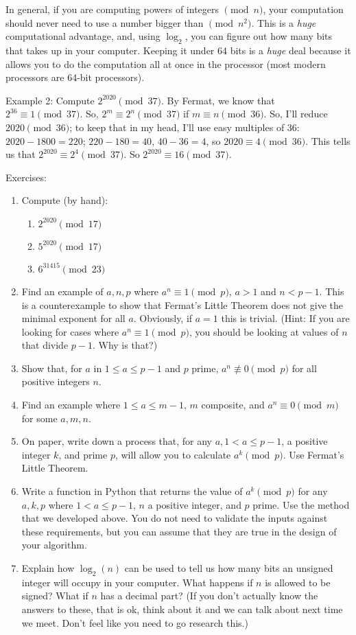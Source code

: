 \documentclass[12pt]{article}
\begin{document}
In general, if you are computing powers of integers $\pmod{n}$, your computation should never need to use a number bigger than $\pmod{n^2}$.  This is a \emph{huge} computational advantage, and, using $\log_2$, you can figure out how many bits that takes up in your computer.  Keeping it under 64 bits is a \emph{huge} deal because it allows you to do the computation all at once in the processor (most modern processors are 64-bit processors).

{\sc Example 2}: Compute $2^{2020} \pmod{37}$.  By Fermat, we know that $2^{36} \equiv 1 \pmod{37}$.  So, $2^m \equiv 2^n \pmod{37}$ if $m \equiv n \pmod{36}$.  So, I'll reduce $2020 \pmod {36}$; to keep that in my head, I'll use easy multiples of 36: $2020-1800 = 220$; $220-180=40$, $40-36=4$, so $2020 \equiv 4 \pmod{36}$.  This tells us that $2^{2020} \equiv 2^4 \pmod{37}$.  So $2^{2020} \equiv 16 \pmod{37}$.

{\sc Exercises}:
\begin{enumerate}
	\item
Compute (by hand):
	\begin{enumerate}
		\item $2^{2020} \pmod{17}$
		\item $5^{2020} \pmod{17}$
		\item $6^{31415} \pmod{23}$
	\end{enumerate}
	\item
Find an example of $a,n,p$ where $a^n \equiv 1 \pmod{p}$, $a > 1$ and $n < p-1$.  This is a counterexample to show that Fermat's Little Theorem does not give the minimal exponent for all $a$.  Obviously, if $a=1$ this is trivial. (Hint: If you are looking for cases where $a^n \equiv 1 \pmod{p}$, you should be looking at values of $n$ that divide $p-1$. Why is that?)
	\item
Show that, for $a$ in $1 \leq a \leq p-1$ and $p$ prime, $a^n \not \equiv 0 \pmod{p}$ for all positive integers $n$.
	\item
Find an example where $1 \leq a \leq m-1$, $m$ composite, and $a^n \equiv 0 \pmod{m}$ for some $a, m, n$.
	\item
On paper, write down a process that, for any $a, 1 < a \leq p-1$, a positive integer $k$, and prime $p$, will allow you to calculate $a^k \pmod{p}$.  Use Fermat's Little Theorem.
	\item
Write a function in Python that returns the value of $a^k \pmod{p}$ for any $a,k,p$ where $1 < a \leq p-1$, $n$ a positive integer, and $p$ prime.  Use the method that we developed above. You do not need to validate the inputs against these requirements, but you can assume that they are true in the design of your algorithm.
	\item
Explain how $\log_2(n)$ can be used to tell us how many bits an unsigned integer will occupy in your computer.  What happens if $n$ is allowed to be signed?  What if $n$ has a decimal part?  (If you don't actually know the answers to these, that is ok, think about it and we can talk about next time we meet.  Don't feel like you need to go research this.)
\end{enumerate}
\end{document}
